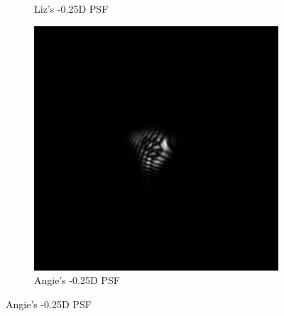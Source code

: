 \documentclass{article}
\begin{document}
\begin{figure}[H]
\begin{subfigure}{.3\textwidth}
  \caption{Liz's -0.25D PSF}
  \label{fig:lizn025dpsf}
\end{subfigure}
\begin{subfigure}{.3\textwidth}
  \centering
  \includegraphics[width=1\linewidth]{Angie_R_0526_1_500_zer_-025_5_PSF.png}
  \caption{Angie's -0.25D PSF}
  \label{fig:angien025dpsf}
\end{subfigure}

\medskip


\end{figure}
\end{document}
